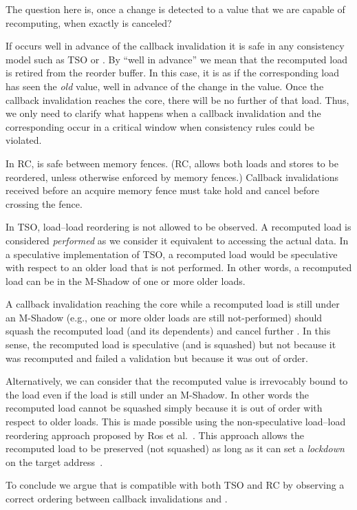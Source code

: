 The question here is, once a change is detected to a value that we are capable of recomputing, when exactly is {\recomp} canceled? 

If {\recomp} occurs well in advance of the callback invalidation it is safe in any consistency model such as TSO or {\rc}. By ``well in advance'' we mean that the recomputed load is retired from the reorder buffer. In this case, it is as if the corresponding load has seen the \emph{old} value, well in advance of the change in the value. Once the callback invalidation reaches the core, there will be no further {\recomp} of that load.
Thus, we only need to clarify what happens when a callback invalidation and the corresponding {\recomp} occur in a critical window when consistency rules could be violated.

In RC, {\recomp} is safe between memory fences. (RC, allows both loads and stores to be reordered, unless otherwise enforced by memory fences.) Callback invalidations received before an acquire memory fence must take hold and cancel {\recomp} before crossing the fence.

In TSO, load--load reordering is not allowed to be observed. A recomputed load is considered \emph{performed} as we consider it equivalent to accessing the actual data. In a speculative implementation of TSO,  a recomputed load would be speculative with respect to an older load that is not performed. In other words, a recomputed load can be  in the M-Shadow of one or more older loads.

A callback invalidation reaching the core while a recomputed load is still under an M-Shadow (e.g., one or more older loads are still not-performed) should squash the recomputed load (and its dependents) and cancel further {\recomp}. In this sense, the recomputed load is speculative (and is squashed) but not because it was recomputed and failed a validation but because it was out of order. 

Alternatively, we can consider that the recomputed value is irrevocably bound to the load even if the load is still under an M-Shadow. In other words the recomputed load cannot be squashed simply because it is out of order with respect to older loads. This is made possible using the non-speculative load--load reordering approach proposed by Ros et al.~\cite{aros-isca17}.  This approach allows the recomputed load to be preserved (not squashed) as long as it can set a \emph{lockdown} on the target address~\cite{aros-isca17}.

To conclude we argue that {\recomp} is compatible with both TSO and RC by observing a correct ordering between callback invalidations and {\recomp}.



